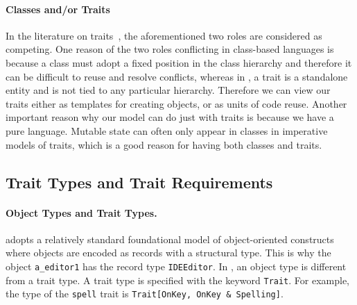 \paragraph{Classes and/or Traits}

In the literature on traits~\citep{Ducasse_2006, scharli2003traits}, the
aforementioned two roles are considered as competing. One reason of the two
roles conflicting in class-based languages is because a class must adopt a fixed
position in the class hierarchy and therefore it can be difficult to reuse and
resolve conflicts, whereas in \sedel, a trait is a standalone entity and is not
tied to any particular hierarchy. Therefore we can view our traits either as templates for creating objects,
or as units of code reuse. Another important reason why our
model can do just with traits is because we have a pure language. Mutable state
can often only appear in classes in imperative models of traits, which is a good
reason for having both classes and traits.





\subsection{Trait Types and Trait Requirements}

\paragraph{Object Types and Trait Types.}
\sedel adopts a relatively standard foundational model of object-oriented
constructs~\citep{DBLP:conf/ecoop/LeeASP15} where objects are encoded as records
with a structural type. This is why the object \lstinline{a_editor1}
has the record type \lstinline{IDEEditor}. In \sedel, an object type is
different from a trait type. A trait type is specified with the keyword
\lstinline{Trait}. For example, the type of the \lstinline{spell} trait is
\lstinline{Trait[OnKey, OnKey & Spelling]}. 

